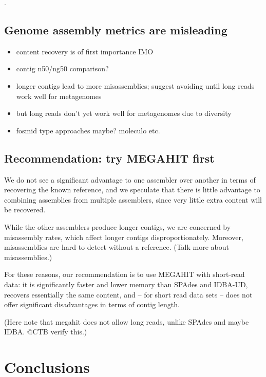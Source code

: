\documentclass[10pt,a4paper,twocolumn]{article}
\begin{document}

. %

\subsection*{Genome assembly metrics are misleading}

\begin{itemize}
\item content recovery is of first importance IMO
\item contig n50/ng50 comparison?
\item longer contigs lead to more misassemblies; suggest avoiding until long reads work well for metagenomes
\item but long reads don't yet work well for metagenomes due to diversity
\item fosmid type approaches maybe? moleculo etc.
\end{itemize}

\subsection*{Recommendation: try MEGAHIT first}

We do not see a significant advantage to one assembler over another in
terms of recovering the known reference, and we speculate that there
is little advantage to combining assemblies from multiple assemblers,
since very little extra content will be recovered.

While the other assemblers produce longer contigs, we are concerned by
misassembly rates, which affect longer contigs disproportionately.
Moreover, misassemblies are hard to detect without a reference. 
(Talk
more about misassemblies.)

For these reasons, our recommendation is to use MEGAHIT with
short-read data: it is significantly faster and lower memory than
SPAdes and IDBA-UD, recovers essentially the same content, and -- for
short read data sets -- does not offer significant disadvantages in
terms of contig length.

(Here note that megahit does not allow long reads, unlike SPAdes and maybe
IDBA. @CTB verify this.)

\section*{Conclusions}
\end{document}
